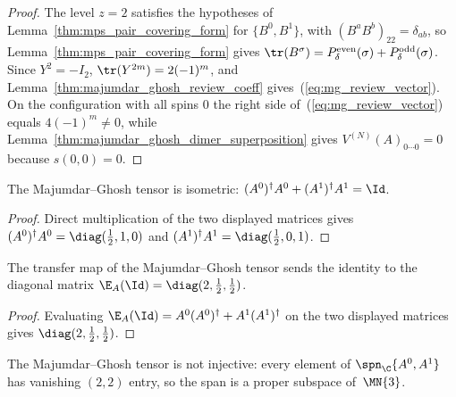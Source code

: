 \begin{proof}
    \leanok
    The level $z=2$ satisfies the hypotheses of
    Lemma~\ref{thm:mps_pair_covering_form} for $\{B^0,B^1\}$, with
    $(B^aB^b)_{22}=\delta_{ab}$,
    so Lemma~\ref{thm:mps_pair_covering_form} gives
    $\tr(B^{\sigma})=P^{\mathrm{even}}_\delta(\sigma)+P^{\mathrm{odd}}_\delta(\sigma)$.
    Since $Y^2=-I_2$, $\tr(Y^{2m})=2(-1)^m$, and
    Lemma~\ref{thm:majumdar_ghosh_review_coeff} gives~(\ref{eq:mg_review_vector}).
    On the configuration with all spins $0$ the right side
    of~(\ref{eq:mg_review_vector}) equals $4(-1)^m\neq0$, while
    Lemma~\ref{thm:majumdar_ghosh_dimer_superposition} gives
    $V^{(N)}(A)_{0\cdots0}=0$ because $s(0,0)=0$.
\end{proof}

\begin{lemma}%
    \label{thm:majumdar_ghosh_left_canonical}
    \leanok
    The Majumdar--Ghosh tensor is isometric:
    $(A^0)^\dagger A^0 + (A^1)^\dagger A^1 = \Id$.
\end{lemma}

\begin{proof}
    \leanok
    Direct multiplication of the two displayed matrices gives
    $(A^0)^\dagger A^0=\diag(\tfrac12,1,0)$ and
    $(A^1)^\dagger A^1=\diag(\tfrac12,0,1)$.
\end{proof}

\begin{lemma}%
    \label{thm:majumdar_ghosh_transfer}
    \leanok
    The transfer map of the Majumdar--Ghosh tensor sends the identity to the
    diagonal matrix $\E_A(\Id) = \diag(2, \tfrac12, \tfrac12)$.
\end{lemma}

\begin{proof}
    \leanok
    Evaluating $\E_A(\Id)=A^0(A^0)^\dagger+A^1(A^1)^\dagger$ on the two
    displayed matrices gives $\diag(2,\tfrac12,\tfrac12)$.
\end{proof}

\begin{lemma}%
    \label{thm:majumdar_ghosh_not_injective}
    \leanok
    The Majumdar--Ghosh tensor is not injective: every element of
    $\spn_{\C}\{A^0, A^1\}$ has vanishing $(2,2)$ entry, so the span is a proper
    subspace of~$\MN{3}$.
\end{lemma}

